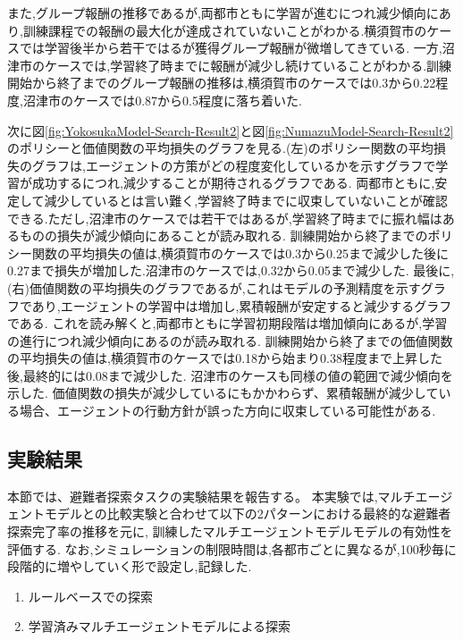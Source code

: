 また,グループ報酬の推移であるが,両都市ともに学習が進むにつれ減少傾向にあり,訓練課程での報酬の最大化が達成されていないことがわかる.横須賀市のケースでは学習後半から若干ではるが獲得グループ報酬が微増してきている.
一方,沼津市のケースでは,学習終了時までに報酬が減少し続けていることがわかる.訓練開始から終了までのグループ報酬の推移は,横須賀市のケースでは0.3から0.22程度,沼津市のケースでは0.87から0.5程度に落ち着いた.\par 
次に図\ref{fig:YokosukaModel-Search-Result2}と図\ref{fig:NumazuModel-Search-Result2}のポリシーと価値関数の平均損失のグラフを見る.(左)のポリシー関数の平均損失のグラフは,エージェントの方策がどの程度変化しているかを示すグラフで学習が成功するにつれ,減少することが期待されるグラフである.
両都市ともに,安定して減少しているとは言い難く,学習終了時までに収束していないことが確認できる.ただし,沼津市のケースでは若干ではあるが,学習終了時までに振れ幅はあるものの損失が減少傾向にあることが読み取れる.
訓練開始から終了までのポリシー関数の平均損失の値は,横須賀市のケースでは0.3から0.25まで減少した後に0.27まで損失が増加した.沼津市のケースでは,0.32から0.05まで減少した.
最後に,(右)価値関数の平均損失のグラフであるが,これはモデルの予測精度を示すグラフであり,エージェントの学習中は増加し,累積報酬が安定すると減少するグラフである.
これを読み解くと,両都市ともに学習初期段階は増加傾向にあるが,学習の進行につれ減少傾向にあるのが読み取れる.
訓練開始から終了までの価値関数の平均損失の値は,横須賀市のケースでは0.18から始まり0.38程度まで上昇した後,最終的には0.08まで減少した.
沼津市のケースも同様の値の範囲で減少傾向を示した.
価値関数の損失が減少しているにもかかわらず、累積報酬が減少している場合、エージェントの行動方針が誤った方向に収束している可能性がある.

\subsection{実験結果}
本節では、避難者探索タスクの実験結果を報告する。
本実験では,マルチエージェントモデルとの比較実験と合わせて以下の2パターンにおける最終的な避難者探索完了率の推移を元に,
訓練したマルチエージェントモデルモデルの有効性を評価する.
なお,シミュレーションの制限時間は,各都市ごとに異なるが,100秒毎に段階的に増やしていく形で設定し,記録した.
\begin{enumerate}
  \item ルールベースでの探索
  \item 学習済みマルチエージェントモデルによる探索
\end{enumerate}

